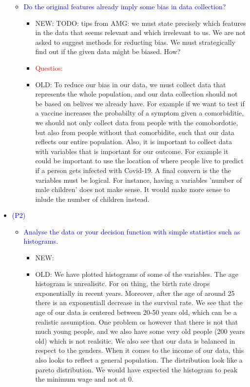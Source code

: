 \begin{itemize}
\begin{itemize}
\begin{itemize}
            \end{itemize}
            \item \textcolor{blue}{Do the original features already imply some bias in data collection?}
            \begin{itemize}
                \item NEW: TODO: tips from AMG: we must state precisely which features in the data that seems relevant and which irrelevant to us. 
                We are not asked to suggest methods for reducting bias. 
                We must strategically find out if the given data might be biased. How?
                \item \textcolor{red}{Questios:}
                \item OLD: To reduce our bias in our data, we must collect data that represents the whole population, and our data collection should not be based on belives we already have. For example if we want to test if a vaccine increases the probabilty of a symptom given a comorbiditie, we should not only collect data from people with the comobordotie, but also from people without that comorbidite, such that our data reflects our entire population. Also, it is important to collect data with variables that is important for our outcome. For example it could be important to use the location of where people live to predict if a person gets infected with Covid-19. A final convern is the the variables must be logical. For instance, having a variables 'number of male children' does not make sense. It would make more sense to inlude the number of children instead. 
            \end{itemize}
        \end{itemize}
    \item \textcolor{blue}{(P2)}
        \begin{itemize}
            \item \textcolor{blue}{Analyse the data or your decision function with simple statistics such as histograms.}
            \begin{itemize}
                \item NEW: 
                \item OLD: We have plotted histograms of some of the variables.
                The age histogram is unrealisitc. For on thing, the birth rate drops exponentially in recent years. Moreover, after the age of around 25 there is an exponentiall decrease in the survival rate. We see that the age of our data is centered between 20-50 years old, which can be a realistic assumption. One problem os however that there is not that much young people, and we also have some very old people (200 years old) which is not realsitic. We also see that our data is balanced in respect to the genders. When it comes to the income of our data, this also looks to reflect a general population. The distribution look like a pareto distribution. We would have expected the histogram to peak the minimum wage and not at 0. 

\end{itemize}
\end{itemize}
\end{itemize}

